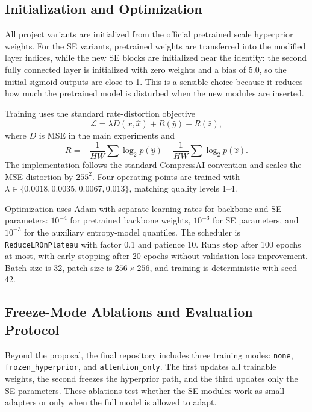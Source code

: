 \documentclass[10pt]{article}
\begin{document}
\subsection{Initialization and Optimization}
All project variants are initialized from the official pretrained scale hyperprior weights. For the SE variants, pretrained weights are transferred into the modified layer indices, while the new SE blocks are initialized near the identity: the second fully connected layer is initialized with zero weights and a bias of 5.0, so the initial sigmoid outputs are close to 1. This is a sensible choice because it reduces how much the pretrained model is disturbed when the new modules are inserted.

Training uses the standard rate-distortion objective
\begin{equation}
\mathcal{L} = \lambda D(x,\hat{x}) + R(\hat{y}) + R(\hat{z}),
\label{eq:rd}
\end{equation}
where \(D\) is MSE in the main experiments and
\begin{equation}
R = -\frac{1}{HW}\sum \log_2 p(\hat{y}) - \frac{1}{HW}\sum \log_2 p(\hat{z}).
\end{equation}
The implementation follows the standard CompressAI convention and scales the MSE distortion by \(255^2\). Four operating points are trained with \(\lambda \in \{0.0018, 0.0035, 0.0067, 0.013\}\), matching quality levels 1--4.

Optimization uses Adam with separate learning rates for backbone and SE parameters: \(10^{-4}\) for pretrained backbone weights, \(10^{-3}\) for SE parameters, and \(10^{-3}\) for the auxiliary entropy-model quantiles. The scheduler is \texttt{ReduceLROnPlateau} with factor 0.1 and patience 10. Runs stop after 100 epochs at most, with early stopping after 20 epochs without validation-loss improvement. Batch size is 32, patch size is \(256\times256\), and training is deterministic with seed 42.

\subsection{Freeze-Mode Ablations and Evaluation Protocol}
Beyond the proposal, the final repository includes three training modes: \texttt{none}, \texttt{frozen\_hyperprior}, and \texttt{attention\_only}. The first updates all trainable weights, the second freezes the hyperprior path, and the third updates only the SE parameters. These ablations test whether the SE modules work as small adapters or only when the full model is allowed to adapt.
\end{document}
